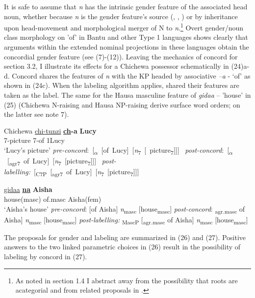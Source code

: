 \documentclass[output=paper
,modfonts
,nonflat]{langsci/langscibook}
\begin{document}
{It is safe to assume that \textit{n} has the intrinsic gender feature of the associated head noun, whether because \textit{n} is the gender feature's source (\citealt{Kramer2015}, \citealt{Kihm2005}, \citealt{Lecarme2002}) or by inheritance upon head-movement and morphological merger of N to \textit{n}.\footnote{As noted in section 1.4 I abstract away from the possibility that roots are acategorial and from related proposals in \citet{Chomsky2015}.} Overt gender/noun class morphology on 'of' in Bantu and other Type 1 languages shows clearly that arguments within the extended nominal projections in these languages obtain the concordial gender feature (see (7)-(12)). Leaving the mechanics of concord for section 3.2, I illustrate its effects for a Chichewa possessor schematically in (24)a-d. Concord shares the features of \textit{n} with the KP headed by associative \textit{–a} - ‘of’ as shown in (24c). When the labeling algorithm applies, shared their features are taken as the label. The same for the Hausa masculine feature of \textit{gidaa} – 'house' in (25) (Chichewa N-raising and Hausa NP-raising derive surface word orders; on the latter see note 7). 

\begin{exe}
	\ex 
	\xlist
	\ex Chichewa \newline
	\gll \underline{chi-tunzi}    \textbf{\underline{ch}-a}  \textbf{Lucy} \\
	7-picture    7-of     1Lucy\\
	\glt `Lucy’s picture'  	
	\ex \mbox{\textit{pre-concord}:   [\textsubscript{$\alpha$} [of Lucy] [\textit{n}\textsubscript{7} [ picture\textsubscript{7}]]] }  
	\ex \mbox{\textit{post-concord}:   [\textsubscript{$\alpha$} [\textsubscript{agr7} of Lucy] [\textit{n}\textsubscript{7} [picture\textsubscript{7}]]] }
	\ex \mbox{\textit{post-labelling:} [\textsubscript{C7P} [\textsubscript{agr7} of Lucy] [\textit{n}\textsubscript{7} [picture\textsubscript{7}]]] } 
	\endxlist
\end{exe}
\begin{exe}
	\ex 
	\xlist
	\ex 
	\gll \underline{gidaa}    \textbf{\underline{na}}  \textbf{Aisha} \\
	house(masc)   of.masc   Aisha(fem)\\
	\glt `Aisha's house'  	
	\ex \textit{pre-concord}:   {\lbrack}[of Aisha] \textit{n}\textsubscript{masc} [house\textsubscript{masc}]{\rbrack}
	\ex \textit{post-concord}:   {\lbrack}\textsubscript{agr.masc} of Aisha] \textit{n}\textsubscript{masc} [house\textsubscript{masc}]{\rbrack}
	\ex \textit{post-labelling:} {\lbrack}\textsubscript{MascP} [\textsubscript{agr.masc} of Aisha] \textit{n}\textsubscript{masc} [house\textsubscript{masc}]{\rbrack}
	\endxlist
\end{exe}
The proposals for gender and labeling are summarized in (26) and (27). Positive answers to the two linked parametric choices in (26) result in the possibility of labeling by concord in (27). 

}
\end{document}
